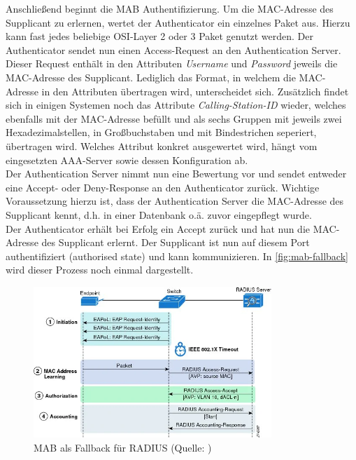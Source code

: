 \documentclass[conference]{IEEEtran}
\begin{document}
Anschließend beginnt die MAB Authentifizierung. Um die MAC-Adresse des Supplicant zu erlernen, wertet der Authenticator ein einzelnes Paket aus. Hierzu kann fast jedes beliebige OSI-Layer 2 oder 3 Paket genutzt werden. Der Authenticator sendet nun einen Access-Request an den Authentication Server. Dieser Request enthält in den Attributen \emph{Username} und \emph{Password} jeweils die MAC-Adresse des Supplicant. \cite{mab-deployment-guide} Lediglich das Format, in welchem die MAC-Adresse in den Attributen übertragen wird, unterscheidet sich. Zusätzlich findet sich in einigen Systemen noch das Attribute \emph{Calling-Station-ID} wieder, welches ebenfalls mit der MAC-Adresse befüllt und als sechs Gruppen mit jeweils zwei Hexadezimalstellen, in Großbuchstaben und mit Bindestrichen seperiert, übertragen wird. Welches Attribut konkret ausgewertet wird, hängt vom eingesetzten AAA-Server sowie dessen Konfiguration ab.\\

Der Authentication Server nimmt nun eine Bewertung vor und sendet entweder eine Accept- oder Deny-Response an den Authenticator zurück. Wichtige Voraussetzung hierzu ist, dass der Authentication Server die MAC-Adresse des Supplicant kennt, d.h. in einer Datenbank o.ä. zuvor eingepflegt wurde.\\

Der Authenticator erhält bei Erfolg ein Accept zurück und hat nun die MAC-Adresse des Supplicant erlernt. Der Supplicant ist nun auf diesem Port authentifiziert (authorised state) und kann kommunizieren. In \autoref{fig:mab-fallback} wird dieser Prozess noch einmal dargestellt.\\

\begin{figure}[hbt]
	\centering
	\includegraphics[width=9cm]{figures/mab-fallback}
	\caption{MAB als Fallback für RADIUS (Quelle: \cite{mab-deployment-guide})}
	\label{fig:mab-fallback}
\end{figure}
\end{document}

